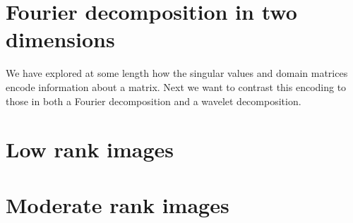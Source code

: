 \break
\clearpage
\section{Fourier decomposition in two dimensions}

We have explored at some length how the singular values and domain matrices encode information about a matrix. Next we want to contrast this encoding to those in both a Fourier decomposition and a wavelet decomposition.

%
%
\section{Low rank images}

%
%
%
%
%

\section{Moderate rank images}
%
%
%
%

%
%

\endinput
